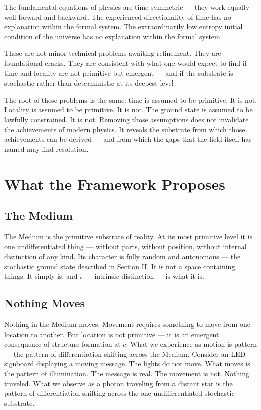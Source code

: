 \documentclass[11pt]{article}
\begin{document}
The fundamental equations of physics are time-symmetric — they work equally well
forward and backward. The experienced directionality of time has no explanation
within the formal system. The extraordinarily low entropy initial condition of the
universe has no explanation within the formal system.

These are not minor technical problems awaiting refinement. They are foundational
cracks. They are consistent with what one would expect to find if time and
locality are not primitive but emergent — and if the substrate is stochastic
rather than deterministic at its deepest level.

The root of these problems is the same: time is assumed to be primitive. It is
not. Locality is assumed to be primitive. It is not. The ground state is assumed
to be lawfully constrained. It is not. Removing those assumptions does not
invalidate the achievements of modern physics. It reveals the substrate from
which those achievements can be derived — and from which the gaps that the field
itself has named may find resolution.
\section{What the Framework Proposes}
\label{sec:org7a7889e}

\subsection{The Medium}
\label{sec:org149837f}

The Medium is the primitive substrate of reality. At its most primitive level it
is one undifferentiated thing — without parts, without position, without internal
distinction of any kind. Its character is fully random and autonomous — the
stochastic ground state described in Section II. It is not a space containing
things. It simply is, and \(\iota\) — intrinsic distinction — is what it is.
\subsection{Nothing Moves}
\label{sec:org5d01081}

Nothing in the Medium moves. Movement requires something to move from one
location to another. But location is not primitive — it is an emergent consequence
of structure formation at \(c\). What we experience as motion is pattern — the
pattern of differentiation shifting across the Medium. Consider an LED signboard
displaying a moving message. The lights do not move. What moves is the pattern
of illumination. The message is real. The movement is not. Nothing traveled.
What we observe as a photon traveling from a distant star is the pattern of
differentiation shifting across the one undifferentiated stochastic substrate.
\end{document}
